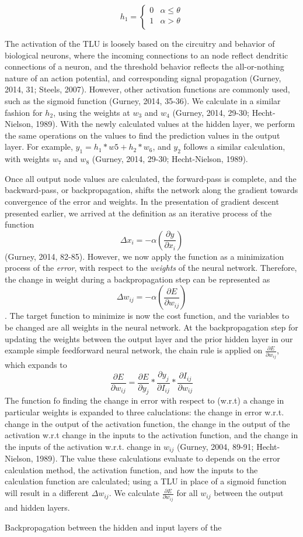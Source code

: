 \documentclass[11pt]{article}
\begin{document}
\[ h_1 = \begin{cases}
	0 & \alpha \leq \theta\\
	1 & \alpha > \theta\\
	\end{cases}
\]

The activation of the TLU is loosely based on the circuitry and behavior of biological neurons, where the incoming connections to an node reflect dendritic connections of a neuron, and the threshold behavior reflects the all-or-nothing nature of an action potential, and corresponding signal propagation (Gurney, 2014, 31; Steels, 2007). However, other activation functions are commonly used, such as the sigmoid function (Gurney, 2014, 35-36). We calculate in a similar fashion for $h_2$, using the weights at $w_3$ and $w_4$ (Gurney, 2014, 29-30; Hecht-Nielson, 1989). With the newly calculated values at the hidden layer, we perform the same operations on the values to find the prediction values in the output layer. For example, $y_1 = h_1*w5 + h_2*w_6$, and $y_2$ follows a similar calculation, with weights $w_7$ and $w_8$ (Gurney, 2014, 29-30; Hecht-Nielson, 1989). \par
Once all output node values are calculated, the forward-pass is complete, and the backward-pass, or backpropagation, shifts the network along the gradient towards convergence of the error and weights. In the presentation of gradient descent presented earlier, we arrived at the definition as an iterative process of the function $$\Delta x_i = -\alpha(\frac{\partial y}{\partial x_i})$$ (Gurney, 2014, 82-85). However, we now apply the function as a minimization process of the \textit{error}, with respect to the \textit{weights} of the neural network. Therefore, the change in weight during a backpropagation step can be represented as $$\Delta w_{ij}= -\alpha(\frac{\partial E}{\partial w_{ij}})$$. The target function to minimize is now the cost function, and the variables to be changed are all weights in the neural network. At the backpropagation step for updating the weights between the output layer and the prior hidden layer in our example simple feedforward neural network, the chain rule is applied on $\frac{\partial E}{\partial w_{ij}} $, which expands to $$\frac{\partial E}{\partial w_{ij}} = \frac{\partial E}{\partial y_j} * \frac{\partial y_j}{\partial I_{ij}} * \frac{\partial I_{ij}}{\partial w_{ij}}$$ The function fo finding the change in error with respect to (w.r.t) a change in particular weights is expanded to three caluclations: the change in error w.r.t. change in the output of the activation function, the change in the output of the activation w.r.t change in the inputs to the activation function, and the change in the inputs of the activation w.r.t. change in $w_{ij}$ (Gurney, 2004, 89-91; Hecht-Nielson, 1989). The value these calculations evaluate to depends on the error calculation method, the activation function, and how the inputs to the calculation function are calculated; using a TLU in place of a sigmoid function will result in a different $\Delta w_{ij}$. We calculate $\frac{\partial E}{\partial w_{ij}}$ for all $w_{ij}$ between the output and hidden layers.\par
Backpropagation between the hidden and input layers of the 
\end{document}
